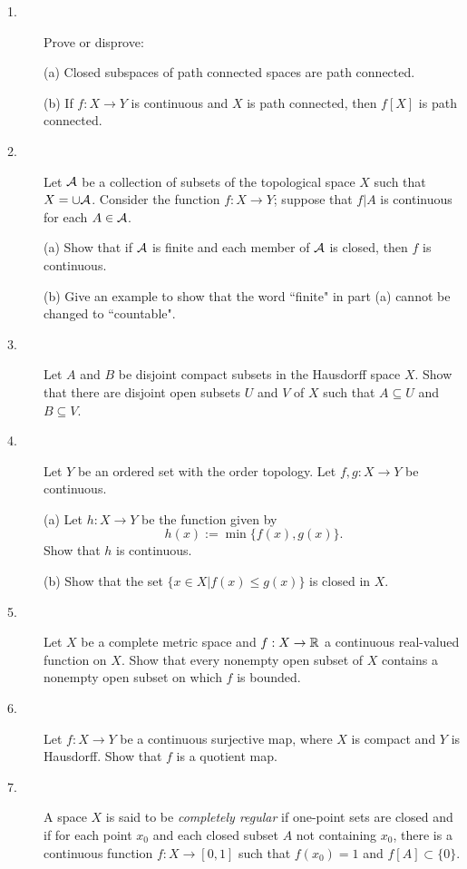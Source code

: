 \documentclass{article}
\begin{document}
\begin{description}

\item[1.]
Prove or disprove:

\item[\quad] (a)
Closed subspaces of path connected spaces are path connected.

\item[\quad] (b)
If $f: X \to Y$ is continuous and $X$ is path connected, then $f[X]$
is path connected.

\item[2.]
Let ${\cal A}$ be a collection of subsets of the topological space $X$
such that $X = \cup {\cal A}$. Consider the function $f: X \to Y$; suppose
that $f|A$ is continuous for each $A \in {\cal A}$.

\item[\quad] (a)
Show that if ${\cal A}$ is finite and each member of ${\cal A}$ is closed,
then $f$ is continuous.

\item[\quad] (b)
Give an example to show that the word ``finite" in part (a) cannot be
changed to ``countable".

\item[3.]
Let $A$ and $B$ be disjoint compact subsets in the Hausdorff space $X$.
Show that there are disjoint open subsets $U$ and $V$ of $X$ such that
$A \subseteq U$ and $B \subseteq V$.

\item[4.]
Let $Y$ be an ordered set with the order topology. Let $f, g :X \to Y$ be
continuous.

\item[\quad] (a)
Let $h : X \to Y$ be the function given by
$$h(x) := \min \{f(x), g(x)\}.$$
Show that $h$ is continuous.

\item[\quad] (b)
Show that the set $\{x \in X|f (x) \leq g(x)\}$ is closed in $X$.

\item[5.]
Let $X$ be a complete metric space and $f: X \to \Bbb R$ a continuous real-valued
function on $X$. Show that every nonempty open subset of $X$ contains a
nonempty open subset on which $f$ is bounded.

\item[6.]
Let $f: X\to Y$ be a continuous surjective map, where $X$ is compact and
$Y$ is Hausdorff. Show that $f$ is a quotient map.

\item[7.]
A space $X$ is said to be {\it completely regular} if one-point sets are
closed and if for each point $x_0$ and each closed subset $A$ not containing
$x_0$, there is a continuous function $f: X \to [0,1]$ such that
$f(x_0) = 1$ and $f[A] \subset \{0\}$.


\end{description}
\end{document}
